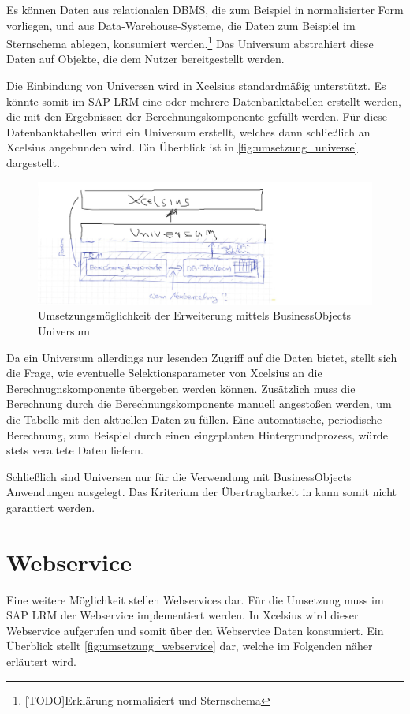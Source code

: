 \begin{onehalfspacing}
Es können Daten aus relationalen \gls{DBMS}, die zum Beispiel in normalisierter Form vorliegen, und aus Data-Warehouse-Systeme, die Daten zum Beispiel im Sternschema ablegen, konsumiert werden.\footnote{[TODO]Erklärung normalisiert und Sternschema} Das Universum abstrahiert diese Daten auf Objekte, die dem Nutzer bereitgestellt werden.


Die Einbindung von Universen wird in Xcelsius standardmäßig unterstützt. Es könnte somit im SAP LRM eine oder mehrere Datenbanktabellen erstellt werden, die mit den Ergebnissen der Berechnungskomponente gefüllt werden. Für diese Datenbanktabellen wird ein Universum erstellt, welches dann schließlich an Xcelsius angebunden wird. Ein Überblick ist in \vref{fig:umsetzung_universe} dargestellt.

\begin{figure}[h]
\centering
\setlength{\unitlength}{1mm}
\includegraphics[width=15cm]{images/umsetzung_universe.jpg}
\caption{Umsetzungsmöglichkeit der Erweiterung mittels BusinessObjects Universum \label{fig:umsetzung_universe}}
\end{figure}

Da ein Universum allerdings nur lesenden Zugriff auf die Daten bietet, stellt sich die Frage, wie eventuelle Selektionsparameter von Xcelsius an die Berechnugnskomponente übergeben werden können. Zusätzlich muss die Berechnung durch die Berechnungskomponente manuell angestoßen werden, um die Tabelle mit den aktuellen Daten zu füllen. Eine automatische, periodische Berechnung, zum Beispiel durch einen eingeplanten Hintergrundprozess, würde stets veraltete Daten liefern.

Schließlich sind Universen nur für die Verwendung mit BusinessObjects Anwendungen ausgelegt. Das Kriterium der Übertragbarkeit in  kann somit nicht garantiert werden.

\section{Webservice}
Eine weitere Möglichkeit stellen Webservices dar. Für die Umsetzung muss im SAP LRM der Webservice implementiert werden. In Xcelsius wird dieser Webservice aufgerufen und somit über den Webservice Daten konsumiert. Ein Überblick stellt \vref{fig:umsetzung_webservice} dar, welche im Folgenden näher erläutert wird.


\end{onehalfspacing}
